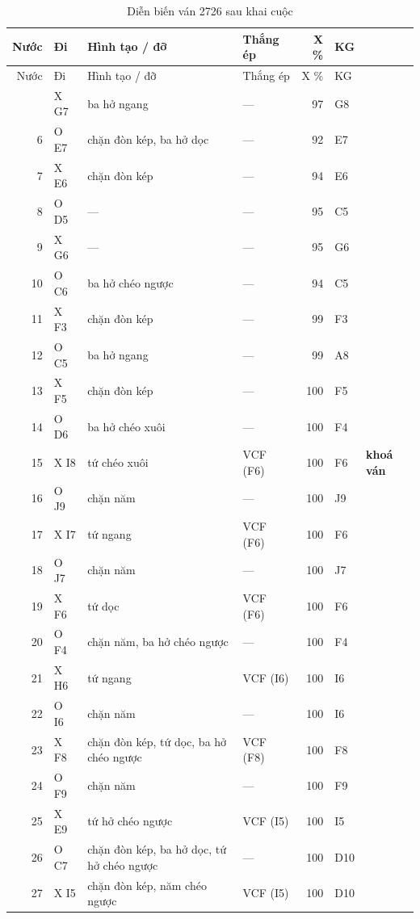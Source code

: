 \par{\scriptsize
\renewcommand{\arraystretch}{0.95}
\begin{longtable}{rlp{4.4cm}lrll}
  \caption{Diễn biến ván 2726 sau khai cuộc}\label{tab:cs-vs-2726}\\
    \toprule
    Nước & Đi & Hình tạo / đỡ & Thắng ép & X \% & KG &  \\
    \midrule
  \endfirsthead
    \toprule
    Nước & Đi & Hình tạo / đỡ & Thắng ép & X \% & KG &  \\
    \midrule
  \endhead
    \bottomrule
  \endfoot
    5 & X G7 & ba hở ngang & --- & 97 & G8 &  \\
    6 & O E7 & chặn đòn kép, ba hở dọc & --- & 92 & E7 &  \\
    7 & X E6 & chặn đòn kép & --- & 94 & E6 &  \\
    8 & O D5 & --- & --- & 95 & C5 &  \\
    9 & X G6 & --- & --- & 95 & G6 &  \\
    10 & O C6 & ba hở chéo ngược & --- & 94 & C5 &  \\
    11 & X F3 & chặn đòn kép & --- & 99 & F3 &  \\
    12 & O C5 & ba hở ngang & --- & 99 & A8 &  \\
    13 & X F5 & chặn đòn kép & --- & 100 & F5 &  \\
    14 & O D6 & ba hở chéo xuôi & --- & 100 & F4 &  \\
    15 & X I8 & tứ chéo xuôi & VCF (F6) & 100 & F6 & \textbf{khoá ván} \\
    16 & O J9 & chặn năm & --- & 100 & J9 &  \\
    17 & X I7 & tứ ngang & VCF (F6) & 100 & F6 &  \\
    18 & O J7 & chặn năm & --- & 100 & J7 &  \\
    19 & X F6 & tứ dọc & VCF (F6) & 100 & F6 &  \\
    20 & O F4 & chặn năm, ba hở chéo ngược & --- & 100 & F4 &  \\
    21 & X H6 & tứ ngang & VCF (I6) & 100 & I6 &  \\
    22 & O I6 & chặn năm & --- & 100 & I6 &  \\
    23 & X F8 & chặn đòn kép, tứ dọc, ba hở chéo ngược & VCF (F8) & 100 & F8 &  \\
    24 & O F9 & chặn năm & --- & 100 & F9 &  \\
    25 & X E9 & tứ hở chéo ngược & VCF (I5) & 100 & I5 &  \\
    26 & O C7 & chặn đòn kép, ba hở dọc, tứ hở chéo ngược & --- & 100 & D10 &  \\
    27 & X I5 & chặn đòn kép, năm chéo ngược & VCF (I5) & 100 & D10 &  \\
\end{longtable}
}
